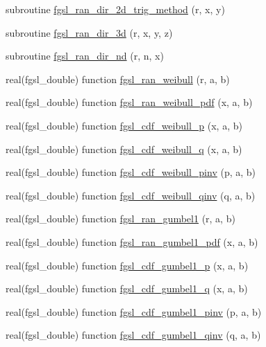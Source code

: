 \begin{DoxyCompactItemize}
\item 
subroutine \hyperlink{rng_8finc_aad06ec726757689953f49b72533502bc}{fgsl\-\_\-ran\-\_\-dir\-\_\-2d\-\_\-trig\-\_\-method} (r, x, y)
\item 
subroutine \hyperlink{rng_8finc_a76b76d07af9c338b59841a300b1fe713}{fgsl\-\_\-ran\-\_\-dir\-\_\-3d} (r, x, y, z)
\item 
subroutine \hyperlink{rng_8finc_a630c7e86d20d111e9e2257c3ca4d3099}{fgsl\-\_\-ran\-\_\-dir\-\_\-nd} (r, n, x)
\item 
real(fgsl\-\_\-double) function \hyperlink{rng_8finc_a2ae4b421d515bf870ec49f005f1004b9}{fgsl\-\_\-ran\-\_\-weibull} (r, a, b)
\item 
real(fgsl\-\_\-double) function \hyperlink{rng_8finc_afe0ac6dc4d46f4844d0fec31f55db2b4}{fgsl\-\_\-ran\-\_\-weibull\-\_\-pdf} (x, a, b)
\item 
real(fgsl\-\_\-double) function \hyperlink{rng_8finc_aac992deb1d7934dace804f0d289463d8}{fgsl\-\_\-cdf\-\_\-weibull\-\_\-p} (x, a, b)
\item 
real(fgsl\-\_\-double) function \hyperlink{rng_8finc_a195b5d5a03a5b2a91dad73d8057333d9}{fgsl\-\_\-cdf\-\_\-weibull\-\_\-q} (x, a, b)
\item 
real(fgsl\-\_\-double) function \hyperlink{rng_8finc_ab388789e3098acaaf9f3cee993b6d442}{fgsl\-\_\-cdf\-\_\-weibull\-\_\-pinv} (p, a, b)
\item 
real(fgsl\-\_\-double) function \hyperlink{rng_8finc_a5114adcd286e64034c0959254212047b}{fgsl\-\_\-cdf\-\_\-weibull\-\_\-qinv} (q, a, b)
\item 
real(fgsl\-\_\-double) function \hyperlink{rng_8finc_ae340600957508ade0da2ca0078720d6a}{fgsl\-\_\-ran\-\_\-gumbel1} (r, a, b)
\item 
real(fgsl\-\_\-double) function \hyperlink{rng_8finc_a7d4cb752dabe9a68cd165e6b717f487b}{fgsl\-\_\-ran\-\_\-gumbel1\-\_\-pdf} (x, a, b)
\item 
real(fgsl\-\_\-double) function \hyperlink{rng_8finc_aa1f725735b86da6477ee1e6e7f23be25}{fgsl\-\_\-cdf\-\_\-gumbel1\-\_\-p} (x, a, b)
\item 
real(fgsl\-\_\-double) function \hyperlink{rng_8finc_a7ee83d5fc3ce8f58396b8fb373d3c3e6}{fgsl\-\_\-cdf\-\_\-gumbel1\-\_\-q} (x, a, b)
\item 
real(fgsl\-\_\-double) function \hyperlink{rng_8finc_a6da83025c6b0132f69e09cc2681507ca}{fgsl\-\_\-cdf\-\_\-gumbel1\-\_\-pinv} (p, a, b)
\item 
real(fgsl\-\_\-double) function \hyperlink{rng_8finc_af40fcfa8cf59b40ac3cb704ba9d38963}{fgsl\-\_\-cdf\-\_\-gumbel1\-\_\-qinv} (q, a, b)

\end{DoxyCompactItemize}
